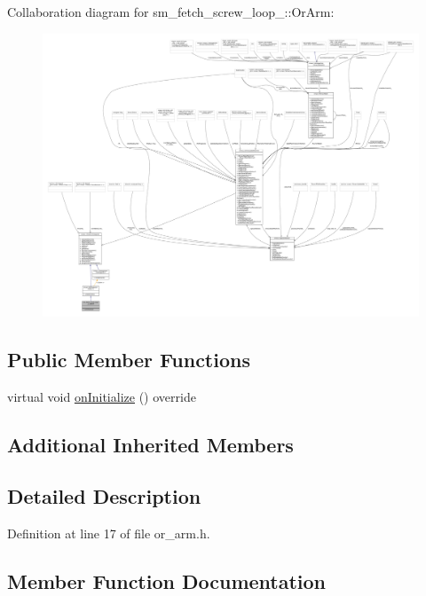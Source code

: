 Collaboration diagram for sm\+\_\+fetch\+\_\+screw\+\_\+loop\+\_\+:\+:Or\+Arm\+:
\nopagebreak
\begin{figure}[H]
\begin{center}
\leavevmode
\includegraphics[width=350pt]{classsm__fetch__screw__loop__1_1_1OrArm__coll__graph}
\end{center}
\end{figure}
\subsection*{Public Member Functions}
\begin{DoxyCompactItemize}
\item 
virtual void \hyperlink{classsm__fetch__screw__loop__1_1_1OrArm_a40a226890f6f2529a2c6e4eb291e1e5f}{on\+Initialize} () override
\end{DoxyCompactItemize}
\subsection*{Additional Inherited Members}


\subsection{Detailed Description}


Definition at line 17 of file or\+\_\+arm.\+h.



\subsection{Member Function Documentation}
\mbox{\label{classsm__fetch__screw__loop__1_1_1OrArm_a40a226890f6f2529a2c6e4eb291e1e5f}} 
